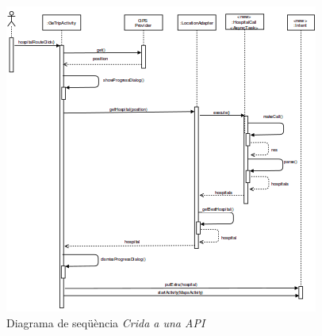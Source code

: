 \begin{figure}[!h]
\centering
\includegraphics[scale=1.2]{Figures/apiDS.png}
\caption{Diagrama de seqüència \textit{Crida a una API}}
\end{figure}

